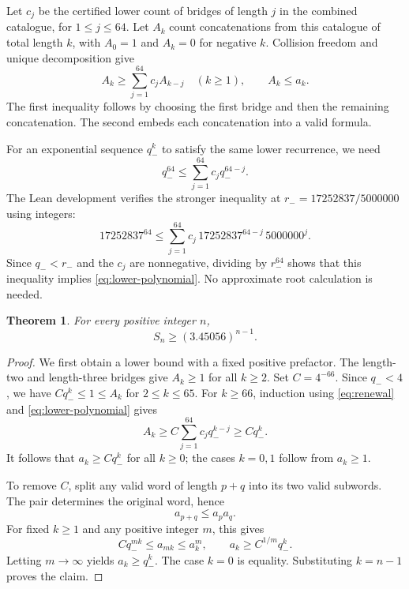 \documentclass[11pt]{article}
\newtheorem{theorem}{Theorem}
\newcommand{\qminus}{q_-}
\begin{document}
Let $c_j$ be the certified lower count of bridges of length $j$ in
the combined catalogue, for $1\leq j\leq64$. Let $A_k$ count
concatenations from this catalogue of total length $k$, with
$A_0=1$ and $A_k=0$ for negative $k$.
Collision freedom and unique decomposition give
\begin{equation}\label{eq:renewal}
 A_k\geq\sum_{j=1}^{64}c_jA_{k-j}\quad(k\geq1),
 \qquad A_k\leq a_k.
\end{equation}
The first inequality follows by choosing the first bridge and then the
remaining concatenation. The second embeds each concatenation into a valid
formula.

For an exponential sequence $\qminus^k$ to satisfy the same lower
recurrence, we need
\begin{equation}\label{eq:lower-polynomial}
 \qminus^{64}\leq\sum_{j=1}^{64}c_j\qminus^{64-j}.
\end{equation}
The Lean development verifies the stronger inequality at
$r_-=17252837/5000000$ using integers:
\[
 17252837^{64}\leq
 \sum_{j=1}^{64}c_j\,17252837^{64-j}\,5000000^j.
\]
Since $\qminus<r_-$ and the $c_j$ are nonnegative, dividing by
$r_-^{64}$ shows that this inequality implies
\eqref{eq:lower-polynomial}. No approximate root calculation is needed.

\begin{theorem}\label{thm:lower}
For every positive integer $n$,
\[
 S_n\geq(3.45056)^{n-1}.
\]
\end{theorem}
\begin{proof}
We first obtain a lower bound with a fixed positive prefactor.
The length-two and length-three bridges give $A_k\geq1$ for all
$k\geq2$. Set $C=4^{-66}$. Since $\qminus<4$, we have
$C\qminus^k\leq1\leq A_k$ for $2\leq k\leq65$.
For $k\geq66$, induction using \eqref{eq:renewal} and
\eqref{eq:lower-polynomial} gives
\[
 A_k\geq C\sum_{j=1}^{64}c_j\qminus^{k-j}
 \geq C\qminus^k.
\]
It follows that $a_k\geq C\qminus^k$ for all $k\geq0$;
the cases $k=0,1$ follow from $a_k\geq1$.

To remove $C$, split any valid word of length $p+q$ into its two
valid subwords. The pair determines the original word, hence
\begin{equation}\label{eq:submultiplicative}
 a_{p+q}\leq a_pa_q.
\end{equation}
For fixed $k\geq1$ and any positive integer $m$, this gives
\[
 C\qminus^{mk}\leq a_{mk}\leq a_k^m,
 \qquad
 a_k\geq C^{1/m}\qminus^k.
\]
Letting $m\to\infty$ yields $a_k\geq\qminus^k$.
The case $k=0$ is equality. Substituting $k=n-1$ proves the claim.
\end{proof}
\end{document}
